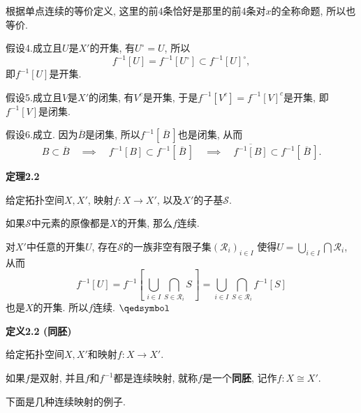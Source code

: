 
根据单点连续的等价定义, 这里的前4条恰好是那里的前4条对$x$的全称命题, 所以也等价.


假设4.成立且$U$是$X'$的开集, 有$U^\circ=U$, 所以
\[
    f^{-1}[U]=f^{-1}[U^\circ]\subset f^{-1}[U]^\circ,
\]
即$f^{-1}[U]$是开集.


假设5.成立且$V$是$X'$的闭集, 有$V^c$是开集, 于是$f^{-1}[V^c]=f^{-1}[V]^c$是开集,
即$f^{-1}[V]$是闭集.


假设6.成立. 因为$\overline{B}$是闭集, 所以$f^{-1}[\,\overline{B}\,]$也是闭集, 从而
\begin{equation*}
    B\subset\overline{B}\quad\implies\quad
    f^{-1}[B]\subset f^{-1}[\,\overline{B}\,]\quad\implies\quad
    \overline{f^{-1}[B]}\subset f^{-1}[\,\overline{B}\,].
\tag*{\qedsymbol}\end{equation*}

\vspace{10pt}

\hypertarget{sec:定理2.2}{}
\noindent\textbf{定理2.2}

给定拓扑空间$X,X'$, 映射$f:X\to X'$, 以及$X'$的子基$\mathcal{S}$.

如果$\mathcal{S}$中元素的原像都是$X$的开集, 那么$f$连续.


对$X'$中任意的开集$U$, 存在$\mathcal{S}$的一族非空有限子集$(\mathcal{R}_i)_{i\in I}$
使得$\displaystyle U=\bigcup_{i\in I}\bigcap\mathcal{R}_i$, 从而
\[
    f^{-1}[U]=f^{-1}\left[\,\bigcup_{i\in I}\bigcap_{S\in\mathcal{R}_i}S\,\right]=
    \bigcup_{i\in I}\bigcap_{S\in\mathcal{R}_i}f^{-1}[S]
\]
也是$X$的开集. 所以$f$连续. \hfill $\qedsymbol$

\vspace{10pt}

\hypertarget{sec:定义2.2}{}
\noindent\textbf{定义2.2 (同胚)}

给定拓扑空间$X,X'$和映射$f:X\to X'$.

如果$f$是双射, 并且$f$和$f^{-1}$都是连续映射, 就称$f$是一个\textbf{同胚},
记作$f:X\cong X'$.





\newpage

下面是几种连续映射的例子.

\vspace{10pt}

